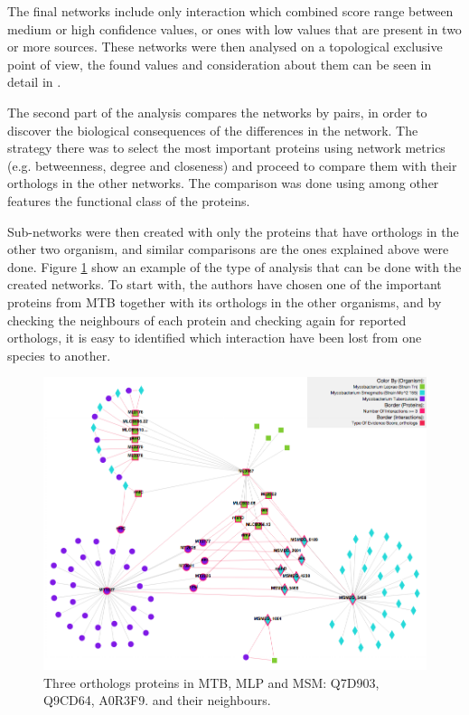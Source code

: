 The final networks include only interaction which combined score range between medium or high confidence values, or ones with low values that are present in two or more sources. These networks were then analysed on a topological exclusive point of view, the found values and consideration about them can be seen in detail in \cite{AKI2013}.

The second part of the analysis compares the networks by pairs, in order to discover the biological consequences of the differences in the network. The strategy there was to select the most important proteins using network metrics (e.g. betweenness, degree and closeness) and proceed to compare them with their orthologs in the other networks. The comparison was done using among other features the functional class of the proteins. 

Sub-networks were then created with only the proteins that have orthologs in the other two organism, and similar comparisons are the ones explained above were done. Figure \ref{fig:pinv_orthologs} show an example of the type of analysis that can be done with the created networks. To start with, the authors have chosen one of the important proteins from MTB together with its orthologs in the other organisms, and by checking the neighbours of each protein and checking again for reported orthologs, it is easy to identified which interaction have been lost from one species to another.

\begin{figure}
\centering
\includegraphics[width=\textwidth]{figures/pinv_orthologs.png}
\caption[Three orthologs proteins in MTB, MLP and MSM]{Three orthologs proteins in MTB, MLP and MSM: Q7D903, Q9CD64, A0R3F9. and their neighbours.
\label{fig:pinv_orthologs}}
\end{figure}

